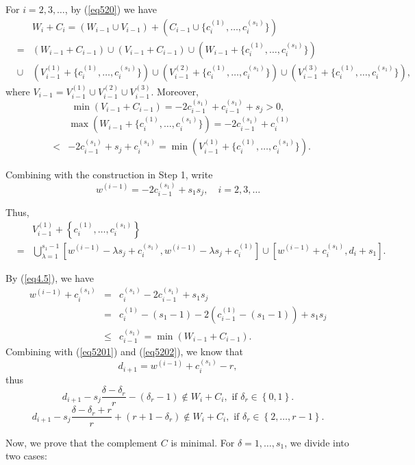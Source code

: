 \documentclass[12pt]{article}
\numberwithin{equation}{section}
\begin{document}
For $i=2,3,\ldots$, by (\ref{eq520}) we have
\begin{eqnarray}\label{eq5201} &&W_i+C_i=(W_{i-1}\cup V_{i-1})+(C_{i-1}\cup \{c_{i}^{(1)}, \ldots, c_{i}^{(s_1)}\})\nonumber\\
&=&(W_{i-1}+C_{i-1})\cup (V_{i-1}+C_{i-1})\cup (W_{i-1}+\{c_{i}^{(1)}, \ldots, c_{i}^{(s_1)}\})\\
&\cup &(V_{i-1}^{(1)}+\{c_{i}^{(1)}, \ldots, c_{i}^{(s_1)}\})\cup (V_{i-1}^{(2)}+\{c_{i}^{(1)}, \ldots, c_{i}^{(s_1)}\})\cup (V_{i-1}^{(3)}+\{c_{i}^{(1)}, \ldots, c_{i}^{(s_1)}\}),\nonumber
\end{eqnarray}
where $V_{i-1}=V_{i-1}^{(1)}\cup V_{i-1}^{(2)}\cup V_{i-1}^{(3)}$.
Moreover, $$\min (V_{i-1}+C_{i-1})=-2c_{i-1}^{(s_1)}+c_{i-1}^{(s_1)}+s_j>0,$$
\begin{eqnarray*}&&\max(W_{i-1}+\{c_{i}^{(1)}, \ldots, c_{i}^{(s_1)}\})=-2 c_{i-1}^{(s_1)}+c_i^{(1)}\\
&<&-2 c_{i-1}^{(s_1)}+s_j+c_i^{(s_1)}
=\min(V_{i-1}^{(1)}+\{c_{i}^{(1)}, \ldots, c_{i}^{(s_1)}\}).\end{eqnarray*}

Combining with the construction in Step 1, write
$$w^{(i-1)}=-2c_{i-1}^{(s_1)}+s_1s_j, \quad i=2,3,\ldots$$

Thus,
\begin{eqnarray}\label{eq5202}&&V_{i-1}^{(1)}+\left\{c_{i}^{(1)}, \ldots, c_{i}^{(s_1)}\right\}\\
&=&\bigcup_{\lambda=1}^{s_1-1}\left[w^{(i-1)}-\lambda s_j+c_{i}^{(s_1)},w^{(i-1)}-\lambda s_j+c_{i}^{(1)}\right]\cup \left[w^{(i-1)}+c_{i}^{(s_1)},d_i+s_1\right].\nonumber
\end{eqnarray}

By (\ref{eq4.5}), we have
\begin{eqnarray*}w^{(i-1)}+c_{i}^{(s_1)}&=&c_{i}^{(s_1)}-2c_{i-1}^{(s_1)}+s_1s_j\\
&=&c_{i}^{(1)}-(s_1-1)-2(c_{i-1}^{(1)}-(s_1-1))+s_1s_j\\
&\leq &c_{i-1}^{(s_1)}=\min (W_{i-1}+C_{i-1}).
\end{eqnarray*}
Combining with (\ref{eq5201}) and (\ref{eq5202}), we know that $$d_{i+1}=w^{(i-1)}+c_{i}^{(s_1)}-r,$$
thus$$d_{i+1}-s_j\frac{\delta-\delta_r}{r}-(\delta_r-1)\notin W_{i}+C_{i}, \text{ if } \delta_r\in \left\{0,1\right\}.$$
$$d_{i+1}-s_j\frac{\delta-\delta_r+r}{r}+(r+1-\delta_r)\notin W_{i}+C_{i}, \text{ if } \delta_r\in \left\{2,\ldots, r-1\right\}.$$


Now, we prove that the complement $C$ is minimal. For $\delta=1,\ldots,s_1$, we divide into two cases:
\end{document}
